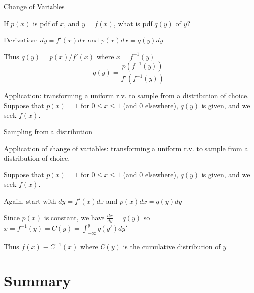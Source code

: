 \documentclass{beamer}
\begin{document}
\begin{frame}{Change of Variables}

\itemb
 \item If $p(x)$ is pdf of $x$, and $y=f(x)$, what is pdf $q(y)$ of $y$?
 \item Derivation: $dy = f'(x)dx$ and $p(x)dx = q(y)dy$
 \item Thus $q(y) = p(x)/f'(x)$ where $x = f^{-1}(y)$
\[
q(y) = \frac{ p(f^{-1}(y)) }{ f'(f^{-1}(y)) }
\]
 \item Application: transforming a uniform r.v. to sample from a distribution of choice.
Suppose that $p(x) = 1$ for $0 \leq x \leq 1$ (and 0 elsewhere), $q(y)$ is given, and we seek $f(x)$.
\iteme

\end{frame}

\begin{frame}{Sampling from a distribution}

\itemb
 \item Application of change of variables: transforming a uniform r.v. to sample from a distribution of choice.
 \item Suppose that $p(x) = 1$ for $0 \leq x \leq 1$ (and 0 elsewhere), $q(y)$ is given, and we seek $f(x)$.
 \item Again, start with $dy = f'(x)dx$ and $p(x)dx = q(y)dy$
 \item Since $p(x)$ is constant, we have $\frac{dx}{dy} = q(y)$ so $x = f^{-1}(y) = C(y) = \int_{-\infty}^y q(y') dy'$
 \item Thus $f(x) \equiv C^{-1}(x)$ where $C(y)$ is the cumulative distribution of $y$
\iteme

\end{frame}



\section*{Summary}
\end{document}
